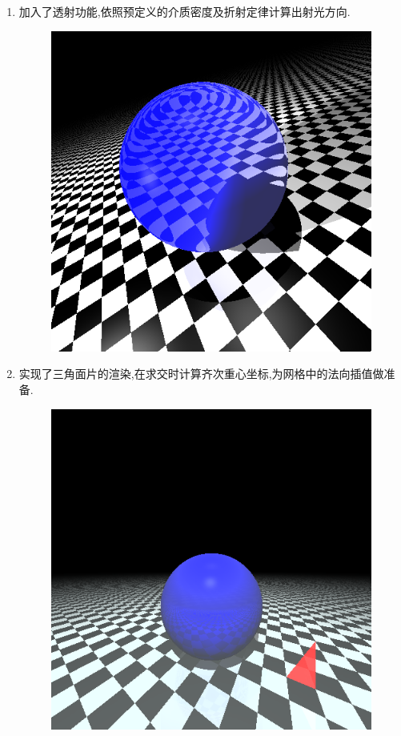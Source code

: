 \begin{enumerate}
\item 加入了透射功能,依照预定义的介质密度及折射定律计算出射光方向.
\begin{figure}[H]
  \centering
  \includegraphics[scale=0.4]{res/transmission.png}
  \caption{\label{fig:transmission}}
\end{figure}

\item 实现了三角面片的渲染,在求交时计算齐次重心坐标,为网格中的法向插值做准备.
\begin{figure}[H]
  \centering
  \includegraphics[scale=0.4]{res/face.png}
  \caption{\label{fig:face}}
\end{figure}


\end{enumerate}

